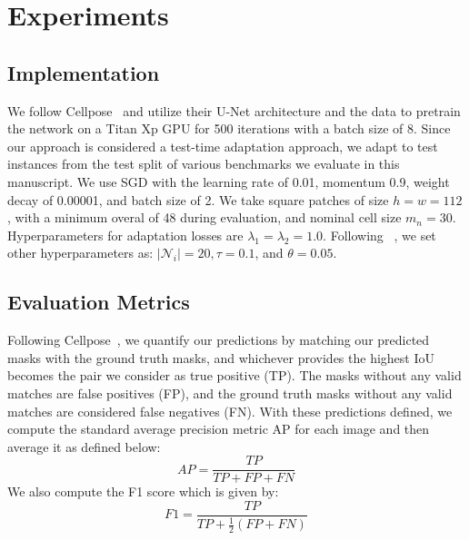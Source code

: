 \section{Experiments}
\subsection{Implementation}

We follow Cellpose~\cite{stringer2021cellpose} and utilize their U-Net architecture and the data to pretrain the network on a Titan Xp GPU for 500 iterations with a batch size of 8. Since our approach is considered a test-time adaptation approach, we adapt to test instances from the test split of various benchmarks we evaluate in this manuscript. We use SGD with the learning rate of 0.01, momentum 0.9, weight decay of 0.00001, and batch size of 2. We take square patches of size $h=w=112$, with a minimum overal of 48 during evaluation, and nominal cell size $m_n = 30$. Hyperparameters for adaptation losses are $\lambda_1 = \lambda_2 = 1.0$.  Following ~\cite{keaton2023celltranspose}, we set other hyperparameters as: $|\mathcal{N}_i|=20, \tau=0.1$, and $\theta=0.05$.

\subsection{Evaluation Metrics}
Following Cellpose~\cite{stringer2021cellpose}, we quantify our predictions by matching our predicted masks with the ground truth masks, and whichever provides the highest IoU becomes the pair we consider as true positive (TP). The masks without any valid matches are false positives (FP), and the ground truth masks without any valid matches are considered false negatives (FN). With these predictions defined, we compute the standard average precision metric AP for each image and then average it as defined below:
\begin{equation}
    AP = \frac{TP}{TP+FP+FN}
\end{equation}   
We also compute the F1 score which is given by:
\begin{equation}
    F1 = \frac{TP}{TP+\frac{1}{2}(FP+FN)}
\end{equation} 
